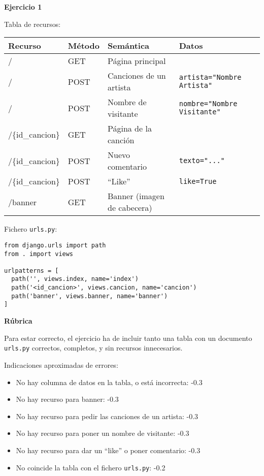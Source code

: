 \textbf{Ejercicio 1}

Tabla de recursos:
\vspace{.4cm}

\begin{tabular}{|l|l|l|l|}
  \hline
  Recurso & Método & Semántica & Datos \\ \hline\hline
  /       & GET    & Página principal & \\
  /       & POST   & Canciones de un artista & \texttt{artista="Nombre Artista"} \\
  /       & POST   & Nombre de visitante & \texttt{nombre="Nombre Visitante"} \\
  /\{id\_cancion\} & GET & Página de la canción & \\
  /\{id\_cancion\} & POST & Nuevo comentario & \texttt{texto="..."}\\
  /\{id\_cancion\} & POST & ``Like'' & \texttt{like=True}\\
  /banner & GET & Banner (imagen de cabecera) &  \\
  \hline
\end{tabular}


\vspace{.4cm}
Fichero \texttt{urls.py}:

\begin{verbatim}
from django.urls import path
from . import views

urlpatterns = [
  path('', views.index, name='index')
  path('<id_cancion>', views.cancion, name='cancion')
  path('banner', views.banner, name='banner')
]
\end{verbatim}

\vspace{.4cm}\textbf{Rúbrica}

Para estar correcto, el ejercicio ha de incluir tanto una tabla con un documento \texttt{urls.py} correctos, completos, y sin recursos innecesarios.

Indicaciones aproximadas de errores:

\begin{itemize}
\item No hay columna de datos en la tabla, o está incorrecta: -0.3
\item No hay recurso para banner: -0.3
\item No hay recurso para pedir las canciones de un artista: -0.3
\item No hay recurso para poner un nombre de visitante: -0.3
\item No hay recurso para dar un ``like'' o poner comentario: -0.3
\item No coincide la tabla con el fichero \texttt{urls.py}: -0.2
\end{itemize}

